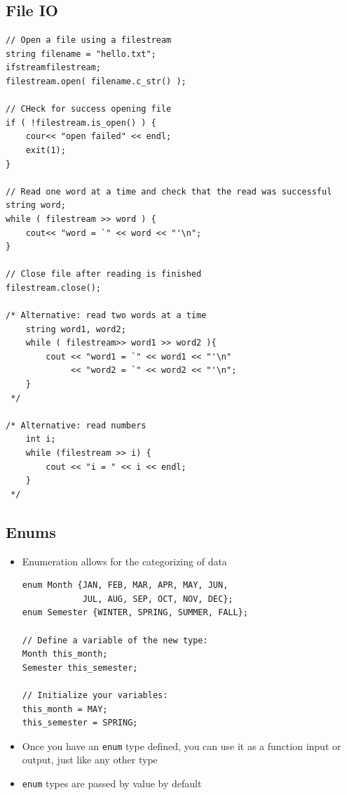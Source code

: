 \subsection{File IO}
\begin{lstlisting}[style=C++]
// Open a file using a filestream
string filename = "hello.txt";
ifstreamfilestream;
filestream.open( filename.c_str() );

// CHeck for success opening file
if ( !filestream.is_open() ) {
	cour<< "open failed" << endl;
	exit(1);
}

// Read one word at a time and check that the read was successful
string word;
while ( filestream >> word ) {
	cout<< "word = `" << word << "'\n";
}

// Close file after reading is finished
filestream.close();

/* Alternative: read two words at a time
	string word1, word2;
	while ( filestream>> word1 >> word2 ){
		cout << "word1 = `" << word1 << "'\n"
			 << "word2 = `" << word2 << "'\n";
	}
 */

/* Alternative: read numbers
	int i;
	while (filestream >> i) {
		cout << "i = " << i << endl;
	}
 */
\end{lstlisting}

\subsection{Enums}
\begin{itemize}
	\item Enumeration allows for the categorizing of data
\begin{lstlisting}[style=C++]
enum Month {JAN, FEB, MAR, APR, MAY, JUN,
			JUL, AUG, SEP, OCT, NOV, DEC};
enum Semester {WINTER, SPRING, SUMMER, FALL};

// Define a variable of the new type:
Month this_month;
Semester this_semester;

// Initialize your variables:
this_month = MAY;
this_semester = SPRING;
\end{lstlisting}
	\item Once you have an \lstinline[style=C++]{enum} type defined, you can use it as a function input or output, just like any other type
	\item \lstinline[style=C++]{enum} types are passed by value by default
\end{itemize}

